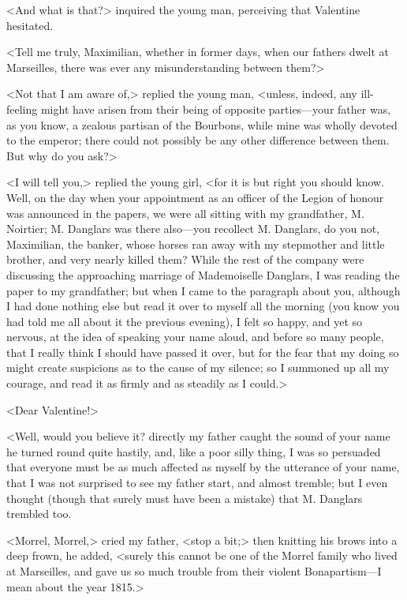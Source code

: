  <And what is that?> inquired the young man, perceiving that Valentine hesitated. 

 <Tell me truly, Maximilian, whether in former days, when our fathers dwelt at Marseilles, there was ever any misunderstanding between them?> 

 <Not that I am aware of,> replied the young man, <unless, indeed, any ill-feeling might have arisen from their being of opposite parties—your father was, as you know, a zealous partisan of the Bourbons, while mine was wholly devoted to the emperor; there could not possibly be any other difference between them. But why do you ask?> 

 <I will tell you,> replied the young girl, <for it is but right you should know. Well, on the day when your appointment as an officer of the Legion of honour was announced in the papers, we were all sitting with my grandfather, M. Noirtier; M. Danglars was there also—you recollect M. Danglars, do you not, Maximilian, the banker, whose horses ran away with my stepmother and little brother, and very nearly killed them? While the rest of the company were discussing the approaching marriage of Mademoiselle Danglars, I was reading the paper to my grandfather; but when I came to the paragraph about you, although I had done nothing else but read it over to myself all the morning (you know you had told me all about it the previous evening), I felt so happy, and yet so nervous, at the idea of speaking your name aloud, and before so many people, that I really think I should have passed it over, but for the fear that my doing so might create suspicions as to the cause of my silence; so I summoned up all my courage, and read it as firmly and as steadily as I could.>  
 
 <Dear Valentine!> 

<Well, would you believe it? directly my father caught the sound of your name he turned round quite hastily, and, like a poor silly thing, I was so persuaded that everyone must be as much affected as myself by the utterance of your name, that I was not surprised to see my father start, and almost tremble; but I even thought (though that surely must have been a mistake) that M. Danglars trembled too. 

<Morrel, Morrel,> cried my father, <stop a bit;> then knitting his brows into a deep frown, he added, <surely this cannot be one of the Morrel family who lived at Marseilles, and gave us so much trouble from their violent Bonapartism—I mean about the year 1815.> 

